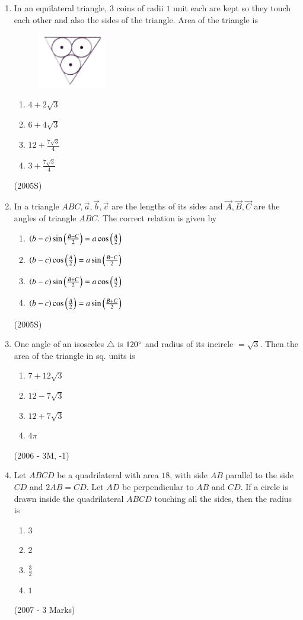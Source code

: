 \documentclass[journal]{IEEEtran}
\begin{document}
\begin{enumerate}
\item In an equilateral triangle, $3$ coins of radii $1$ unit each are kept so they touch each other and also the sides of the triangle. Area of the triangle is 
\begin{figure}[htp]
    \centering
    \includegraphics[width=3cm]{figs/figure.png}
    \label{fig:figure}
\end{figure}
\begin{enumerate}
\item $4+2\sqrt{3}$
\item $6+4\sqrt{3}$
\item $12+\frac{7\sqrt{3}}{4}$
\item $3+\frac{7\sqrt{3}}{4}$
\end{enumerate}
\hfill (2005S)

\item In a triangle $ABC, \vec{a}, \vec{b}, \vec{c}$  are the lengths of its sides and $\vec{A}, \vec{B}, \vec{C}$ are the angles of triangle $ABC$. The correct relation is given by
\begin{enumerate}
\item $\left(b-c\right) \sin \left(\frac{B-C}{2}\right) = a \cos \left(\frac{A}{2}\right)$
\item $\left(b-c\right) \cos \left(\frac{A}{2}\right) = a \sin \left(\frac{B-C}{2}\right)$
\item $\left(b-c\right) \sin \left(\frac{B+C}{2}\right) = a \cos \left(\frac{A}{2}\right)$
\item $\left(b-c\right) \cos \left(\frac{A}{2}\right) = a \sin \left(\frac{B+C}{2}\right)$
\end{enumerate}
\hfill (2005S)

\item One angle of an isosceles $\triangle$ is $120\degree$ and radius of its incircle $= \sqrt{3}$. Then the area of the triangle in sq. units is 
\begin{enumerate}
\item $7+12\sqrt{3}$
\item $12-7\sqrt{3}$
\item $12+7\sqrt{3}$
\item $4\pi$
\end{enumerate}
\hfill (2006 - 3M, -1)

\item Let $ABCD$ be a quadrilateral with area $18$, with side $AB$ parallel to the side $CD$ and $2AB = CD$. Let $AD$ be perpendicular to $AB$ and $CD$. If a circle is drawn inside the quadrilateral $ABCD$ touching all the sides, then the radius is
\begin{enumerate}
\item $3$
\item $2$
\item $\frac{3}{2}$
\item $1$
\end{enumerate}
\hfill (2007 - 3 Marks)


\end{enumerate}
\end{document}

